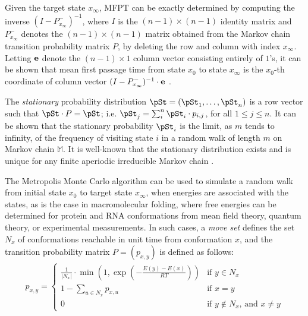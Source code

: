 Given the target state $x_{\infty}$, MFPT can be exactly
determined by computing the inverse
$(I - P^{-}_{x_{\infty}})^{-1}$, where $I$ is the $(n-1)\times (n-1)$ identity
matrix and $P^{-}_{x_{\infty}}$
denotes the $(n-1)\times (n-1)$ matrix obtained from the
Markov chain transition probability matrix $P$,
by deleting the row and column with index $x_{\infty}$.
Letting ${\bf e}$ denote the
$(n-1) \times 1$ column vector consisting entirely of $1$'s, it can be
shown that mean first passage time from state $x_0$ to state $x_{\infty}$
is the $x_0$-th coordinate
of column vector
$(I - P^{-}_{x_{\infty}})^{-1} \cdot {\bf e}$ \cite{meyerMFPT}.


The {\em stationary} probability distribution $\pSt = (\pSt_1,\ldots,\pSt_n)$
is a row vector such that $\pSt \cdot P = \pSt$; i.e.
$\pSt_j = \sum_{i}^n \pSt_i \cdot p_{i,j}$, for all $1\leq j \leq n$.
It can be shown that the stationary probability $\pSt_i$ is the limit,
as $m$ tends to infinity, of the frequency of visiting state $i$ in a
random walk of length $m$ on Markov chain $\mathbb{M}$.
It is well-known that the stationary distribution exists and is unique
for any finite aperiodic irreducible Markov chain \cite{cloteBackofen:book}.

The Metropolis Monte Carlo algorithm \cite{metropolis:MonteCarlo} can
be used to simulate a random walk from initial state $x_0$ to target state
$x_{\infty}$, when energies are associated with the states, as is the case in
macromolecular folding, where free energies can be determined for
protein and RNA conformations from mean field theory, quantum theory,
or experimental measurements. In such cases, a {\em move set}
defines the set $N_x$ of conformations reachable in unit time
from conformation $x$, and the transition probability matrix
$P = (p_{x,y})$ is defined as follows:
\begin{align}
\label{eq:transitionProb1}
p_{x,y} = \left\{
\begin{array}{ll}
\frac{1}{|N_x|} \cdot \min\left(1,\exp(-\frac{E(y)-E(x)}{RT})\right)
&\mbox{if $y \in N_x$}\\
1 - \sum_{u \in N_x} p_{x,u} &\mbox{if $x=y$}\\
0 &\mbox{if $y \not\in N_x$, and $x \ne y$}
\end{array} \right.
\end{align}

